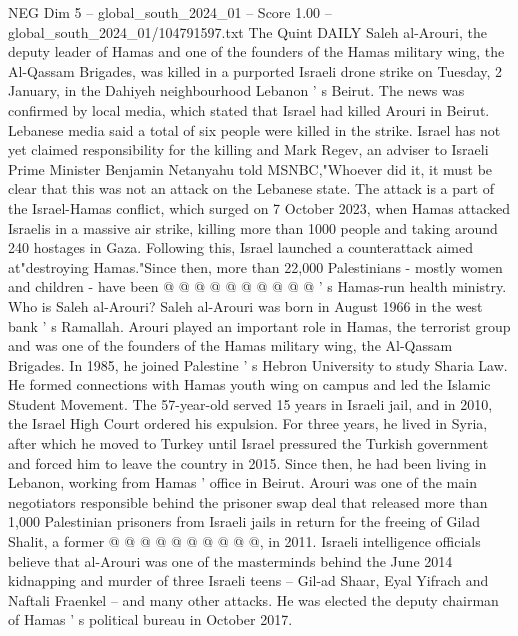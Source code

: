 \begin{textsample}{NEG Dim 5 – global\_south\_2024\_01 – Score 1.00 – global\_south\_2024\_01/104791597.txt}  \label{ex:f5_neg_436}
The Quint DAILY Saleh al-Arouri, the deputy leader of Hamas and one of the founders of the Hamas military wing, the Al-Qassam Brigades, was killed in a purported Israeli drone strike on Tuesday, 2 January, in the Dahiyeh neighbourhood Lebanon ' s Beirut.
The news was confirmed by local media, which stated that Israel had killed Arouri in Beirut.
Lebanese media said a total of six people were killed in the strike.
Israel has not yet claimed responsibility for the killing and Mark Regev, an adviser to Israeli Prime Minister Benjamin Netanyahu told MSNBC,"Whoever did it, it must be clear that this was not an attack on the Lebanese state.
The attack is a part of the Israel-Hamas conflict, which surged on 7 October 2023, when Hamas attacked Israelis in a massive air strike, killing more than 1000 people and taking around 240 hostages in Gaza.
Following this, Israel launched a counterattack aimed at"destroying Hamas."Since then, more than 22,000 Palestinians - mostly women and children - have been @ @ @ @ @ @ @ @ @ @ ' s Hamas-run health ministry.
Who is Saleh al-Arouri?
Saleh al-Arouri was born in August 1966 in the west bank ' s Ramallah.
Arouri played an important role in Hamas, the terrorist group and was one of the founders of the Hamas military wing, the Al-Qassam Brigades.
In 1985, he joined Palestine ' s Hebron University to study Sharia Law.
He formed connections with Hamas youth wing on campus and led the Islamic Student Movement.
The 57-year-old served 15 years in Israeli jail, and in 2010, the Israel High Court ordered his expulsion.
For three years, he lived in Syria, after which he moved to Turkey until Israel pressured the Turkish government and forced him to leave the country in 2015.
Since then, he had been living in Lebanon, working from Hamas ' office in Beirut.
Arouri was one of the main negotiators responsible behind the prisoner swap deal that released more than 1,000 Palestinian prisoners from Israeli jails in return for the freeing of Gilad Shalit, a former @ @ @ @ @ @ @ @ @ @, in 2011.
Israeli intelligence officials believe that al-Arouri was one of the masterminds behind the June 2014 kidnapping and murder of three Israeli teens -- Gil-ad Shaar, Eyal Yifrach and Naftali Fraenkel -- and many other attacks.
He was elected the deputy chairman of Hamas ' s political bureau in October 2017.

\end{textsample}

